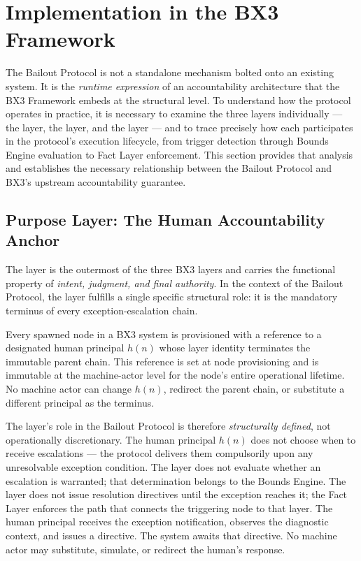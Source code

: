 \section{Implementation in the BX3 Framework}
\label{sec:implementation}

The Bailout Protocol is not a standalone mechanism bolted onto an existing system. It is the \emph{runtime expression} of an accountability architecture that the BX3 Framework embeds at the structural level. To understand how the protocol operates in practice, it is necessary to examine the three layers individually --- the \purpose{} layer, the \bounds{} layer, and the \fact{} layer --- and to trace precisely how each participates in the protocol's execution lifecycle, from trigger detection through Bounds Engine evaluation to Fact Layer enforcement. This section provides that analysis and establishes the necessary relationship between the Bailout Protocol and BX3's upstream accountability guarantee.

\subsection{Purpose Layer: The Human Accountability Anchor}
\label{sec:purpose-layer}

The \purpose{} layer is the outermost of the three BX3 layers and carries the functional property of \emph{intent, judgment, and final authority}. In the context of the Bailout Protocol, the \purpose{} layer fulfills a single specific structural role: it is the mandatory terminus of every exception-escalation chain.

Every spawned node in a BX3 system is provisioned with a reference to a designated human principal $h(n)$ whose \purpose{} layer identity terminates the immutable parent chain. This reference is set at node provisioning and is immutable at the machine-actor level for the node's entire operational lifetime. No machine actor can change $h(n)$, redirect the parent chain, or substitute a different principal as the terminus.

The \purpose{} layer's role in the Bailout Protocol is therefore \emph{structurally defined}, not operationally discretionary. The human principal $h(n)$ does not choose when to receive escalations --- the protocol delivers them compulsorily upon any unresolvable exception condition. The \purpose{} layer does not evaluate whether an escalation is warranted; that determination belongs to the Bounds Engine. The \purpose{} layer does not issue resolution directives until the exception reaches it; the Fact Layer enforces the path that connects the triggering node to that layer. The human principal receives the exception notification, observes the diagnostic context, and issues a directive. The system awaits that directive. No machine actor may substitute, simulate, or redirect the human's response.

